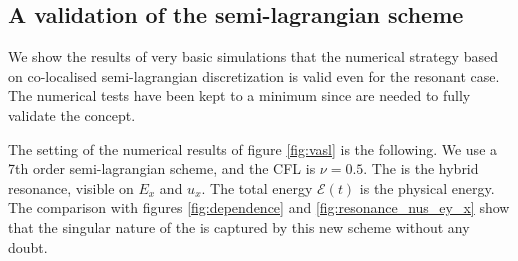 

\FloatBarrier

\subsection{A validation of the semi-lagrangian scheme}

We show the results of very basic simulations that the numerical strategy 
based on co-localised semi-lagrangian discretization is valid even for the resonant 
case.
The numerical tests have been kept to a minimum since  are needed to fully validate
the concept.

The setting of the numerical results of figure \ref{fig:vasl}
is the following. We use a 7th order semi-lagrangian scheme, and the CFL is $\nu=0.5$.
The  is the hybrid resonance, visible on $E_x$ and $u_x$.
The total energy $\mathcal E(t)$ is the physical energy. 
The comparison with figures \ref{fig:dependence} and \ref{fig:resonance_nus_ey_x} show that the 
singular nature of the  is captured by this new scheme without any doubt.

